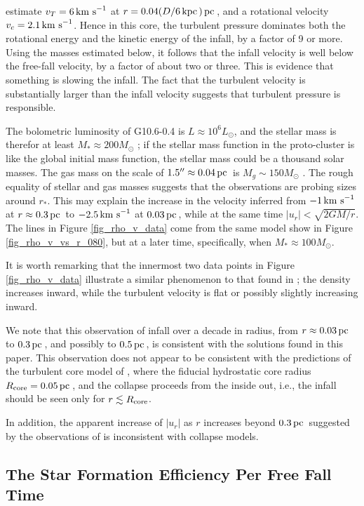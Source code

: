\documentclass[iop,apj,numberedappendix]{emulateapj}
\newcommand       \kpc		{\,{\rm kpc \,}}
\newcommand       \pc		{\,{\rm pc \,}}
\newcommand       \kms          {\,{\rm km \,\, s}^{-1}}
\begin{document}
\citet{2011A&A...525A.151B} estimate $v_T=6\kms$ at
$r=0.04(D/6\kpc)\pc$, and a rotational velocity $v_c=2.1\kms$. Hence
in this core, the turbulent pressure dominates both the rotational
energy and the kinetic energy of the infall, by a factor of 9 or
more. Using the masses estimated below, it follows that the infall
velocity is well below the free-fall velocity, by a factor of about
two or three. This is evidence that something is slowing the infall. The fact
that the turbulent velocity is substantially larger than the infall
velocity suggests that turbulent pressure is responsible.

The bolometric luminosity of G10.6-0.4 is $L\approx10^6L_\odot$, and
the stellar mass is therefor at least $M_*\approx 200M_\odot$
\citep{2011ApJ...729..100L}; if the stellar mass function in the
proto-cluster is like the global initial mass function, the stellar
mass could be a thousand solar masses. The gas mass on the scale of
$1.5''\approx 0.04\pc$ is $M_g\sim150M_\odot$
\citep{2009ApJ...703.1308K}. The rough equality of stellar and gas
masses suggests that the observations are probing sizes around
$r_*$. This may explain the increase in the velocity inferred from
$-1\kms$ at $r\approx0.3\pc$ to $-2.5\kms$ at $0.03\pc$, while at the
same time $|u_r|<\sqrt{2GM/r}$. The lines in Figure
\ref{fig_rho_v_data} come from the same model show in Figure
\ref{fig_rho_v_vs_r_080}, but at a later time, specifically, when
$M_*\approx100M_\odot$.

It is worth remarking that the innermost two data points in Figure
\ref{fig_rho_v_data} illustrate a similar phenomenon to that found in
\citet{1997ApJ...476..730P}; the density increases inward, while the
turbulent velocity is flat or possibly slightly increasing inward.

We note that this observation of infall over a decade in radius, from
$r\approx 0.03\pc$ to $0.3\pc$, and possibly to $0.5\pc$, is
consistent with the solutions found in this paper. This observation
does not appear to be consistent with the predictions of the turbulent
core model of \citet{2003ApJ...585..850M}, where the fiducial
hydrostatic core radius $R_{\rm core}=0.05\pc$, and the collapse
proceeds from the inside out, i.e., the infall should be seen only for
$r\lesssim R_{\rm core}$. 

In addition, the apparent increase of $|u_r|$ as $r$ increases beyond
$0.3\pc$ suggested by the observations of \citet{1986ApJ...304..501H}
is inconsistent with collapse models.

\subsection{The Star Formation Efficiency Per Free Fall Time}
\end{document}
